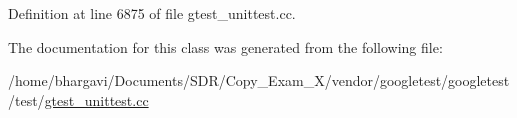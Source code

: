 Definition at line 6875 of file gtest\+\_\+unittest.\+cc.



The documentation for this class was generated from the following file\+:\begin{DoxyCompactItemize}
\item 
/home/bhargavi/\+Documents/\+S\+D\+R/\+Copy\+\_\+\+Exam\+\_\+X/vendor/googletest/googletest/test/\hyperlink{gtest__unittest_8cc}{gtest\+\_\+unittest.\+cc}\end{DoxyCompactItemize}
